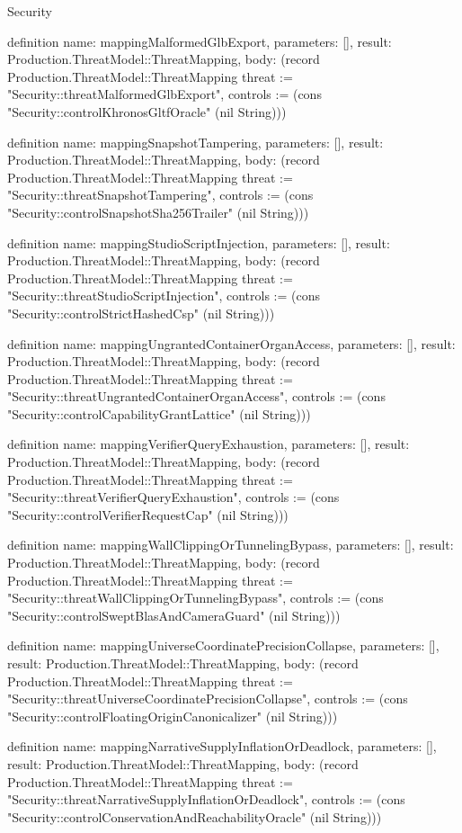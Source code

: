 \begin{lexlean}{Security}
\begin{semanticmodule}
definition{
  name: mappingMalformedGlbExport,
  parameters: [],
  result: Production.ThreatModel::ThreatMapping,
  body: (record Production.ThreatModel::ThreatMapping {threat := "Security::threatMalformedGlbExport", controls := (cons "Security::controlKhronosGltfOracle" (nil String))})
}

definition{
  name: mappingSnapshotTampering,
  parameters: [],
  result: Production.ThreatModel::ThreatMapping,
  body: (record Production.ThreatModel::ThreatMapping {threat := "Security::threatSnapshotTampering", controls := (cons "Security::controlSnapshotSha256Trailer" (nil String))})
}

definition{
  name: mappingStudioScriptInjection,
  parameters: [],
  result: Production.ThreatModel::ThreatMapping,
  body: (record Production.ThreatModel::ThreatMapping {threat := "Security::threatStudioScriptInjection", controls := (cons "Security::controlStrictHashedCsp" (nil String))})
}

definition{
  name: mappingUngrantedContainerOrganAccess,
  parameters: [],
  result: Production.ThreatModel::ThreatMapping,
  body: (record Production.ThreatModel::ThreatMapping {threat := "Security::threatUngrantedContainerOrganAccess", controls := (cons "Security::controlCapabilityGrantLattice" (nil String))})
}

definition{
  name: mappingVerifierQueryExhaustion,
  parameters: [],
  result: Production.ThreatModel::ThreatMapping,
  body: (record Production.ThreatModel::ThreatMapping {threat := "Security::threatVerifierQueryExhaustion", controls := (cons "Security::controlVerifierRequestCap" (nil String))})
}

definition{
  name: mappingWallClippingOrTunnelingBypass,
  parameters: [],
  result: Production.ThreatModel::ThreatMapping,
  body: (record Production.ThreatModel::ThreatMapping {threat := "Security::threatWallClippingOrTunnelingBypass", controls := (cons "Security::controlSweptBlasAndCameraGuard" (nil String))})
}

definition{
  name: mappingUniverseCoordinatePrecisionCollapse,
  parameters: [],
  result: Production.ThreatModel::ThreatMapping,
  body: (record Production.ThreatModel::ThreatMapping {threat := "Security::threatUniverseCoordinatePrecisionCollapse", controls := (cons "Security::controlFloatingOriginCanonicalizer" (nil String))})
}

definition{
  name: mappingNarrativeSupplyInflationOrDeadlock,
  parameters: [],
  result: Production.ThreatModel::ThreatMapping,
  body: (record Production.ThreatModel::ThreatMapping {threat := "Security::threatNarrativeSupplyInflationOrDeadlock", controls := (cons "Security::controlConservationAndReachabilityOracle" (nil String))})
}


\end{semanticmodule}
\end{lexlean}
